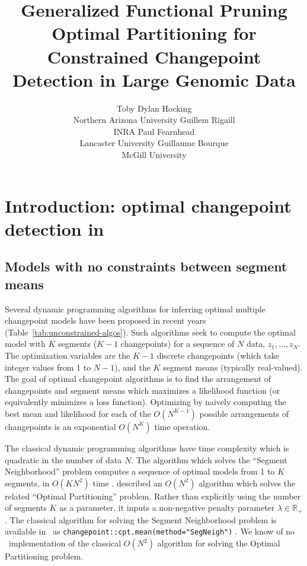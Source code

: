 \documentclass[article]{jss}
\author{Toby Dylan Hocking\\Northern Arizona University
   \And Guillem Rigaill\\INRA
   \And Paul Fearnhead\\Lancaster University
   \And Guillaume Bourque\\McGill University}
\title{Generalized Functional Pruning Optimal Partitioning
  for Constrained Changepoint Detection in Large Genomic Data}
\newcommand{\R}{\proglang{R}}
\newcommand{\RR}{\mathbb R}
\begin{document}


\section[Introduction: optimal changepoint detection in R]{Introduction: optimal changepoint detection in } \label{sec:intro}

\subsection{Models with no constraints between segment means}

Several dynamic programming algorithms for inferring optimal multiple
changepoint models have been proposed in recent years
(Table~\ref{tab:unconstrained-algos}). Such algorithms seek to compute
the optimal model with $K$ segments ($K-1$ changepoints) for a
sequence of $N$ data, $z_1,\dots,z_N$. The optimization variables are
the $K-1$ discrete changepoints (which take integer values from 1 to
$N-1$), and the $K$ segment means (typically real-valued). The goal of
optimal changepoint algorithms is to find the arrangement of
changepoints and segment means which maximizes a likelihood function
(or equivalently minimizes a loss function). Optimizing by naively
computing the best mean and likelihood for each of the $O(N^{K-1})$
possible arrangements of changepoints is an exponential $O(N^K)$ time
operation.

The classical dynamic programming algorithms have time complexity
which is quadratic in the number of data $N$. The algorithm which
solves the ``Segment Neighborhood'' problem computes a sequence of
optimal models from 1 to $K$ segments, in $O(KN^2)$ time
\citet{segment-neighborhood}.  \citet{optimal-partitioning} described
an $O(N^2)$ algorithm which solves the related ``Optimal
Partitioning'' problem. Rather than explicitly using the number of
segments $K$ as a parameter, it inputs a non-negative penalty
parameter $\lambda\in \RR_+$. The classical algorithm for solving the
Segment Neighborhood problem is available in \R\ as
\verb|changepoint::cpt.mean(method="SegNeigh")|
\citep{changepoint}. We know of no \R\ implementation of the classical
$O(N^2)$ algorithm for solving the Optimal Partitioning problem.
\end{document}
